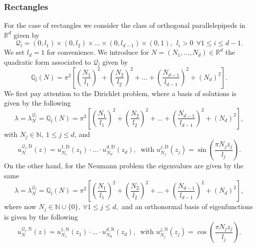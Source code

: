 \documentclass{amsart}
\theoremstyle{definition}
\theoremstyle{remark}
\def\RR{\mathbb{R}}
\renewcommand\leq\leqslant
\numberwithin{equation}{section}
\theoremstyle{definition}
\theoremstyle{remark}
\def\RR{\mathbb{R}}
\begin{document}
\subsubsection{Rectangles}\label{rect}
For the case of rectangles we consider the class of orthogonal parallelepipeds in $\RR^d$ given by \begin{equation}
	\mathcal{Q}_l=(0,l_1)\times(0,l_2)\times\ldots\times(0,l_{d-1})\times(0,1),\ \ l_i>0 \ \ \forall 1\leq i\leq d-1.
\end{equation}We set $l_d=1$ for convenience. 
We introduce for $N=\left(N_1,\ldots,N_d\right)\in\mathbb{R}^d$ the quadratic form associated to $\mathcal{Q}_l$ given by \begin{equation}
	\mathbb{Q}_l(N)=\pi^2\left[\left(\frac{N_1}{l_1}\right)^2+\left(\frac{N_2}{l_2}\right)^2+\ldots+\left(\frac{N_{d-1}}{l_{d-1}}\right)^2+\left(N_d\right)^2\right].
\end{equation}
We first pay attention to the Dirichlet problem, where a basis of solutions is given by the following
\begin{equation}
	\lambda=\lambda_N^{\mathcal{Q}_l}=\mathbb{Q}_l(N)=\pi^2\left[\left(\frac{N_1}{l_1}\right)^2+\left(\frac{N_2}{l_2}\right)^2+\ldots+\left(\frac{N_{d-1}}{l_{d-1}}\right)^2+\left(N_d\right)^2\right],
\end{equation}with $N_j\in \mathbb{N},\ 1\leq j\leq d$, and
\begin{equation}
	u_{N}^{\mathcal{Q}_l,\mathrm{D}}(z)=u_{N_1}^{1,\mathrm{D}}(z_1)\cdot\ldots\cdot u_{N_d}^{d,\mathrm{D}}(z_d),\ \text{ with }u_{N_j}^{j,\mathrm{D}}(z_j)=\sin\left(\frac{\pi N_j z_j}{l_j}\right).
\end{equation}
On the other hand, for the Neumann problem the eigenvalues are given by the same 
\begin{equation}
	\lambda=\lambda_N^{\mathcal{Q}_l}=\mathbb{Q}_l\left(N\right)=\pi^2\left[\left(\frac{N_1}{l_1}\right)^2+\left(\frac{N_2}{l_2}\right)^2+\ldots+\left(\frac{N_{d-1}}{l_{d-1}}\right)^2+\left(N_d\right)^2\right],\end{equation}where now $N_j\in \mathbb{N}\cup \{0\},\ \forall1\leq j\leq d,$ and an orthonormal basis of eigenfunctions is given by the following
\begin{equation}
	u_{N}^{\mathcal{Q}_l,\mathrm{N}}(z)=u_{N_1}^{1,\mathrm{N}}(z_1)\cdot\ldots\cdot u_{N_d}^{d,\mathrm{N}}(z_d),\ \text{ with }u_{N_j}^{j,\mathrm{N}}(z_j)=\cos\left(\frac{\pi N_j z_j}{l_j}\right).
\end{equation}
\end{document}
